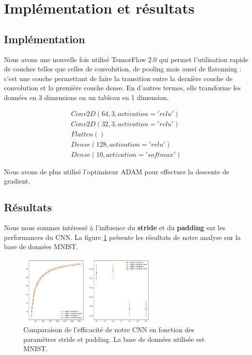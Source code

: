 \section{Implémentation et résultats}

\subsection{Implémentation}

Nous avons une nouvelle fois utilisé TensorFlow 2.0 qui permet l'utilisation rapide de couches telles que celles de convolution, de pooling mais aussi de flatenning : c'est une couche permettant de faire la transition entre la dernière couche de convolution et la première couche dense. En d'autres termes, elle transforme les données en 3 dimensions en un tableau en 1 dimension.

\[ \begin{array}{lcr}
	Conv2D(64, 3, activation='relu') \\
    Conv2D(32, 3, activation='relu') \\
    Flatten() \\
    Dense(128, activation='relu') \\
    Dense(10, activation='softmax')\end{array}\]

Nous avons de plus utilisé l'optimiseur ADAM pour effectuer la descente de gradient.

\subsection{Résultats}

Nous nous sommes intéressé à l'influence du \textbf{stride} et du \textbf{padding} sur les performances du CNN. La figure \ref{resultat_padding_stride} présente les résultats de notre analyse sur la base de données MNIST.

\begin{figure}[!h]
\centering
\includegraphics[width=200pt]{images/cnn/CNN_padding_stride.png}
\caption{Comparaison de l'efficacité de notre CNN en fonction des paramètres stride et padding. La base de données utilisée est MNIST.}
\label{resultat_padding_stride}
\end{figure}

